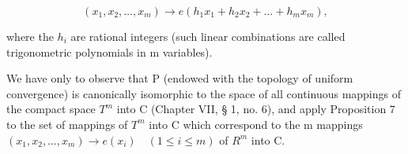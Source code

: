\[
(x _ {1}, x _ {2}, \dots , x _ {m}) \rightarrow e (h _ {1} x _ {1} + h _ {2} x _ {2} + \dots + h _ {m} x _ {m}),
\]

where the \(h_{i}\) are rational integers (such linear combinations are called trigonometric polynomials in m variables).

We have only to observe that P (endowed with the topology of uniform convergence) is canonically isomorphic to the space of all continuous mappings of the compact space \(T^{m}\) into C (Chapter VII, § 1, no. 6), and apply Proposition 7 to the set of mappings of \(T^{m}\) into C which correspond to the m mappings \((x_{1}, x_{2}, \ldots, x_{m}) \to e(x_{i}) \quad (1 \leqslant i \leqslant m)\) of \(R^{m}\) into C.

\ExerciseGroupsStart


